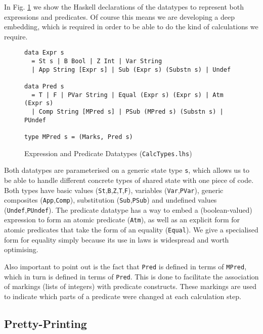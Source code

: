 In Fig. \ref{fig:expr-pred-types} we show the Haskell declarations
of the datatypes to represent both expressions and predicates.
Of course this means we are developing a deep embedding\cite{Gibbons:2014:FDS},
which is required in order to be able to do the kind of calculations we require.
\begin{figure}[tb]
\begin{verbatim}
data Expr s
  = St s | B Bool | Z Int | Var String
  | App String [Expr s] | Sub (Expr s) (Substn s) | Undef

data Pred s
  = T | F | PVar String | Equal (Expr s) (Expr s) | Atm (Expr s)
  | Comp String [MPred s] | PSub (MPred s) (Substn s) | PUndef

type MPred s = (Marks, Pred s)
\end{verbatim}
  \caption{Expression and Predicate Datatypes (\texttt{CalcTypes.lhs})}
  \label{fig:expr-pred-types}
\end{figure}
Both datatypes are parameterised on a generic state type \texttt{s},
which allows us to be able to handle different concrete types
of shared state with one piece of code.
Both types have basic values (\texttt{St},\texttt{B},\texttt{Z},\texttt{T},\texttt{F}),
variables (\texttt{Var},\texttt{PVar}),
generic composites (\texttt{App},\texttt{Comp}),
substitution (\texttt{Sub},\texttt{PSub})
and undefined values (\texttt{Undef},\texttt{PUndef}).
The predicate datatype has a way to embed a (boolean-valued)
expression to form an atomic predicate (\texttt{Atm}),
as well as an explicit form for atomic predicates that take
the form of an equality (\texttt{Equal}).
We give a specialised form for equality simply because
its use in laws is widespread and worth optimising.

Also important to point out is the fact that \texttt{Pred} is
defined in terms of \texttt{MPred}, which in turn is defined
in terms of \texttt{Pred}.
This is done to facilitate the association of markings (lists of integers)
with predicate constructs.
These markings are used to indicate which parts of a predicate
were changed at each calculation step.


\subsection{Pretty-Printing}\label{ssec:pp}

